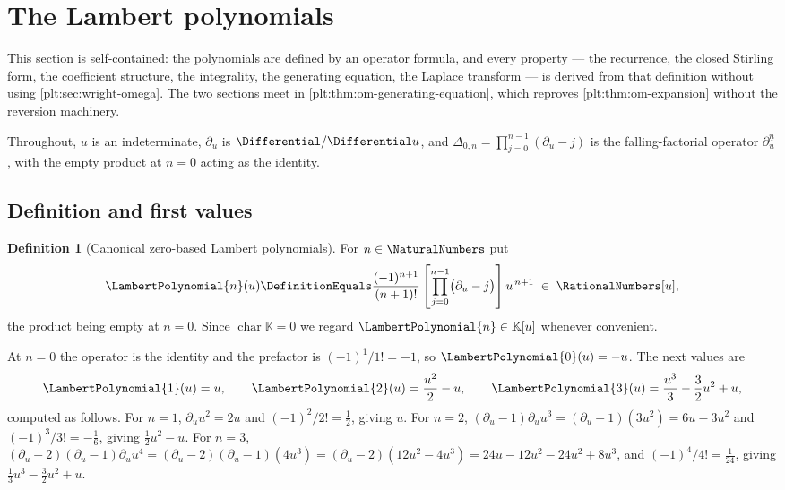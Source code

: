 \documentclass[11pt,oneside]{article}
\theoremstyle{plain}
\theoremstyle{definition}
\newtheorem{definition}[theorem]{Definition}
\theoremstyle{remark}
\newcommand{\K}{\mathbb{K}}
\newcommand{\shiftop}[2]{\Delta_{#1,#2}}                 %
\newcommand{\LamP}[1]{\LambertPolynomial{#1}}
\begin{document}
\section{The Lambert polynomials}
\label{plt:sec:lambert-polynomials}

This section is self-contained: the polynomials are defined by an operator
formula, and every property --- the recurrence, the closed Stirling form, the
coefficient structure, the integrality, the generating equation, the Laplace
transform --- is derived from that definition without using
\cref{plt:sec:wright-omega}.  The two sections meet in
\cref{plt:thm:om-generating-equation}, which reproves
\cref{plt:thm:om-expansion} without the reversion machinery.

Throughout, \(u\) is an indeterminate, \(\partial_u\) is
\(\Differential/\Differential u\), and \(\shiftop{0}{n}=\prod_{j=0}^{n-1}(\partial_u-j)\)
is the falling-factorial operator \(\partial_u^{\underline n}\), with the
empty product at \(n=0\) acting as the identity.

\subsection{Definition and first values}

\begin{definition}[Canonical zero-based Lambert polynomials]
\label{plt:def:lambert-polynomials}
For \(n\in\NaturalNumbers\) put
\begin{equation}\label{plt:eq:lambert-operator}
 \LamP{n}(u)
 \DefinitionEquals
 \frac{(-1)^{n+1}}{(n+1)!}
 \left[\prod_{j=0}^{n-1}\bigl(\partial_u-j\bigr)\right]u^{\,n+1}
 \;\in\;\RationalNumbers[u],
\end{equation}
the product being empty at \(n=0\).  Since \(\operatorname{char}\K=0\) we
regard \(\LamP{n}\in\K[u]\) whenever convenient.
\end{definition}

At \(n=0\) the operator is the identity and the prefactor is
\((-1)^{1}/1!=-1\), so \(\LamP{0}(u)=-u\).  The next values are
\begin{equation}\label{plt:eq:lambert-first-values}
 \LamP{1}(u)=u,\qquad
 \LamP{2}(u)=\frac{u^{2}}{2}-u,\qquad
 \LamP{3}(u)=\frac{u^{3}}{3}-\frac32u^{2}+u,
\end{equation}
computed as follows.  For \(n=1\),
\(\partial_uu^{2}=2u\) and \((-1)^{2}/2!=\tfrac12\), giving \(u\).  For
\(n=2\), \((\partial_u-1)\partial_uu^{3}=(\partial_u-1)(3u^{2})=6u-3u^{2}\)
and \((-1)^{3}/3!=-\tfrac16\), giving \(\tfrac12u^{2}-u\).  For \(n=3\),
\((\partial_u-2)(\partial_u-1)\partial_uu^{4}
=(\partial_u-2)(\partial_u-1)(4u^{3})
=(\partial_u-2)(12u^{2}-4u^{3})
=24u-12u^{2}-24u^{2}+8u^{3}\), and \((-1)^{4}/4!=\tfrac1{24}\), giving
\(\tfrac13u^{3}-\tfrac32u^{2}+u\).
\end{document}
